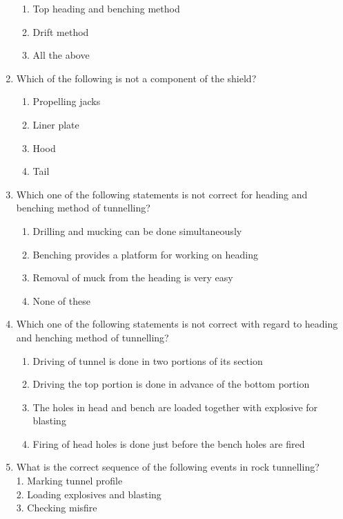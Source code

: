 \documentclass[11pt,a4paper]{article}
\begin{document}
\begin{enumerate}
\begin{enumerate}[label=\Alph*.]
\item{Top heading and benching method}
\item{Drift method}
\item{All the above}
\end{enumerate}
\item{Which of the following is not a component of the shield?}
\begin{enumerate}[label=\Alph*.]
\item{Propelling jacks}
\item{Liner plate}
\item{Hood}
\item{Tail}
\end{enumerate}
\item{Which one of the following statements is not correct for heading and benching method of tunnelling?}
\begin{enumerate}[label=\Alph*.]
\item{Drilling and mucking can be done simultaneously}
\item{Benching provides a platform for working on heading}
\item{Removal of muck from the heading is very easy}
\item{None of these}
\end{enumerate}
\item{Which one of the following statements is not correct with regard to heading and henching method of tunnelling?}
\begin{enumerate}[label=\Alph*.]
\item{Driving of tunnel is done in two portions of its section}
\item{Driving the top portion is done in advance of the bottom portion}
\item{The holes in head and bench are loaded together with explosive for blasting}
\item{Firing of head holes is done just before the bench holes are fired}
\end{enumerate}
\item{What is the correct sequence of the following events in rock tunnelling? \\

1. Marking tunnel profile \\

2. Loading explosives and blasting \\

3. Checking misfire \\

}
\end{enumerate}
\end{document}
